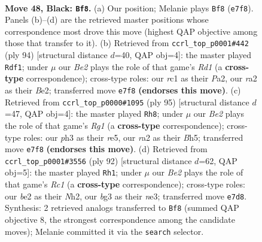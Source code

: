 \documentclass[11pt]{article}
\begin{document}
\clearpage

\begin{figure}[p]\centering
\begin{subfigure}{0.46\textwidth}\centering
\resizebox{\linewidth}{!}{%
\newchessgame
\chessboard[
  setfen={7r/p3b2p/P4k1n/2r5/8/1Pp3BP/R1P1B1P1/2R4K b - - 4 48},
  showmover=false,
  pgfstyle=straightmove, color=movearrow, markmove={e7-f8}
]}
\caption{}
\end{subfigure}\hfill
\begin{subfigure}{0.46\textwidth}\centering
\resizebox{\linewidth}{!}{%
\newchessgame
\chessboard[
  setfen={8/2k1r2p/1pb3p1/p1n5/2P1pR2/7P/P3B1P1/3R2K1 w - - 6 48},
  showmover=false,
  pgfstyle=straightmove, color=movearrow, markmove={d1-f1}
]}
\caption{}
\end{subfigure}
\\[4pt]
\begin{subfigure}{0.46\textwidth}\centering
\resizebox{\linewidth}{!}{%
\newchessgame
\chessboard[
  setfen={6r1/5pk1/8/4R1Pb/1P5P/P1n1P2B/2r2P2/R5K1 b - - 2 48},
  showmover=false,
  pgfstyle=straightmove, color=movearrow, markmove={g8-h8}
]}
\caption{}
\end{subfigure}\hfill
\begin{subfigure}{0.46\textwidth}\centering
\resizebox{\linewidth}{!}{%
\newchessgame
\chessboard[
  setfen={5b2/3R4/p1r2pk1/P5p1/2p2p2/2P1nP2/1P5N/1KR5 w - - 1 47},
  showmover=false,
  pgfstyle=straightmove, color=movearrow, markmove={c1-h1}
]}
\caption{}
\end{subfigure}
\caption{\textbf{Move 48, Black: \texttt{Bf8}.} (a) Our position; Melanie plays \texttt{Bf8} (\texttt{e7f8}). Panels (b)--(d) are the retrieved master positions whose correspondence most drove this move (highest QAP objective among those that transfer to it). (b) Retrieved from \texttt{ccrl\_top\_p0001\#442} (ply 94) [structural distance $d$=40, QAP obj=4]: the master played \texttt{Rdf1}; under $\mu$ our \emph{Be2} plays the role of that game's \emph{Rd1} (a \textbf{cross-type} correspondence); cross-type roles: our \emph{r}c1 as their \emph{P}a2, our \emph{r}a2 as their \emph{B}e2; transferred move \texttt{e7f8} \textbf{(endorses this move)}. (c) Retrieved from \texttt{ccrl\_top\_p0000\#1095} (ply 95) [structural distance $d$=47, QAP obj=4]: the master played \texttt{Rh8}; under $\mu$ our \emph{Be2} plays the role of that game's \emph{Rg1} (a \textbf{cross-type} correspondence); cross-type roles: our \emph{p}h3 as their \emph{r}e5, our \emph{r}a2 as their \emph{B}h5; transferred move \texttt{e7f8} \textbf{(endorses this move)}. (d) Retrieved from \texttt{ccrl\_top\_p0001\#3556} (ply 92) [structural distance $d$=62, QAP obj=5]: the master played \texttt{Rh1}; under $\mu$ our \emph{Be2} plays the role of that game's \emph{Rc1} (a \textbf{cross-type} correspondence); cross-type roles: our \emph{b}e2 as their \emph{N}h2, our \emph{b}g3 as their \emph{n}e3; transferred move \texttt{e7d8}. Synthesis: 2 retrieved analogs transferred to \texttt{Bf8} (summed QAP objective 8, the strongest correspondence among the candidate moves); Melanie committed it via the \texttt{search} selector.}
\label{fig:thought-m95}
\end{figure}
\end{document}
